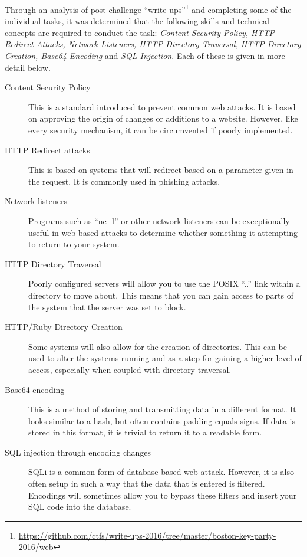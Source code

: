 \documentclass[a4paper,11pt]{report}
\begin{document}
			Through an analysis of post challenge ``write ups''\footnote{\url{https://github.com/ctfs/write-ups-2016/tree/master/boston-key-party-2016/web}}
			and completing some of the individual tasks, 
			it was determined that the following skills and technical concepts are required to conduct the task: 
			\textit{Content Security Policy, HTTP Redirect Attacks, Network Listeners, HTTP Directory Traversal, HTTP Directory Creation, Base64 Encoding} and \textit{SQL Injection}.
			Each of these is given in more detail below. 
			\begin{description}
				\item[Content Security Policy]
					This is a standard introduced to prevent common web attacks. 
					It is based on approving the origin of changes or additions to a website. 
					However, like every security mechanism, it can be circumvented if poorly implemented. 
				\item[HTTP Redirect attacks] 
					This is based on systems that will redirect based on a parameter given in the request. 
					It is commonly used in phishing attacks. 
				\item[Network listeners] 
					Programs such as ``nc -l'' or other network listeners can be exceptionally useful in web based attacks to determine whether something it attempting to return to your system. 
				\item[HTTP Directory Traversal] 
					Poorly configured servers will allow you to use the POSIX ``..'' link within a directory to move about. 
					This means that you can gain access to parts of the system that the server was set to block. 
				\item[HTTP/Ruby Directory Creation] 
					Some systems will also allow for the creation of directories. 
					This can be used to alter the systems running and as a step for gaining a higher level of access, especially when coupled with directory traversal. 
				\item[Base64 encoding] 
					This is a method of storing and transmitting data in a different format. 
					It looks similar to a hash, but often contains padding equals signs. 
					If data is stored in this format, it is trivial to return it to a readable form. 
				\item[SQL injection through encoding changes] 
					SQLi is a common form of database based web attack. 
					However, it is also often setup in such a way that the data that is entered is filtered. 
					Encodings will sometimes allow you to bypass these filters and insert your SQL code into the database. 
			\end{description}
\end{document}
